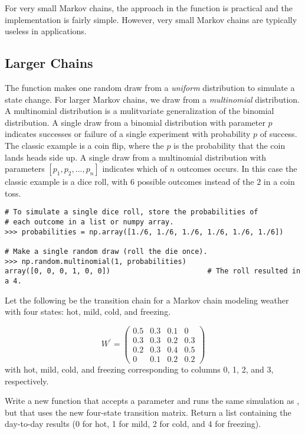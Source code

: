 For very small Markov chains, the approach in the  function is practical and the implementation is fairly simple.
However, very small Markov chains are typically useless in applications.

\subsection*{Larger Chains}

The  function makes one random draw from a \emph{uniform} distribution to simulate a state change.
For larger Markov chains, we draw from a \emph{multinomial} distribution.
A multinomial distribution is a mulitvariate generalization of the binomial distribution.
A single draw from a binomial distribution with parameter $p$ indicates successes or failure of a single experiment with probability $p$ of success.
The classic example is a coin flip, where the $p$ is the probability that the coin lands heads side up.
A single draw from a multinomial distribution with parameters $\left[p_1, p_2, ..., p_n \right]$ indicates which of $n$ outcomes occurs.
In this case the classic example is a dice roll, with $6$ possible outcomes instead of the $2$ in a coin toss.

\begin{lstlisting}
# To simulate a single dice roll, store the probabilities of
# each outcome in a list or numpy array.
>>> probabilities = np.array([1./6, 1./6, 1./6, 1./6, 1./6, 1./6])

# Make a single random draw (roll the die once).
>>> np.random.multinomial(1, probabilities)         
array([0, 0, 0, 1, 0, 0])                       # The roll resulted in a 4.
\end{lstlisting}

\begin{problem}
Let the following be the transition chain for a Markov chain modeling weather with four states: hot, mild, cold, and freezing.

\[ W^\prime = \left( \begin{array}{cccc}
0.5 & 0.3 & 0.1 & 0\\
0.3 & 0.3 & 0.2 & 0.3\\
0.2 & 0.3 & 0.4 & 0.5\\
  0 & 0.1 & 0.2 & 0.2\end{array} \right)\]
with hot, mild, cold, and freezing corresponding to columns 0, 1, 2, and 3, respectively.

Write a new function that accepts a parameter  and runs the same simulation as , but that uses the new four-state transition matrix.
Return a list containing the day-to-day results (0 for hot, 1 for mild, 2 for cold, and 4 for freezing).
\label{problem:transition}
\end{problem}

